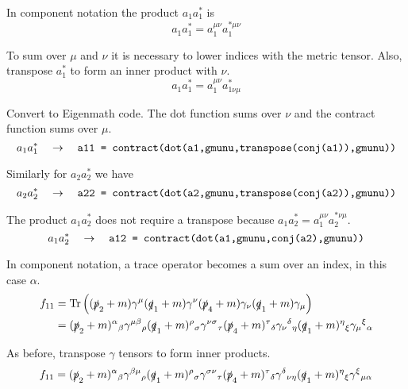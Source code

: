 In component notation the product $a_1a_1^*$ is
\begin{equation*}
a_1a_1^*=a_1^{\mu\nu}a_1^{*\mu\nu}
\end{equation*}

To sum over $\mu$ and $\nu$ it is necessary to lower indices with the metric tensor.
Also, transpose $a_1^*$ to form an inner product with $\nu$.
\begin{equation*}
a_1a_1^*=a_1^{\mu\nu}a_{1\nu\mu}^*
\end{equation*}

Convert to Eigenmath code.
The dot function sums over $\nu$ and the contract function sums over $\mu$.
\begin{equation*}
a_1a_1^*
\quad\rightarrow\quad
\text{\tt a11 = contract(dot(a1,gmunu,transpose(conj(a1)),gmunu))}
\end{equation*}

Similarly for $a_2a_2^*$ we have
\begin{equation*}
a_2a_2^*
\quad\rightarrow\quad
\text{\tt a22 = contract(dot(a2,gmunu,transpose(conj(a2)),gmunu))}
\end{equation*}

The product $a_1a_2^*$ does not require a transpose because $a_1a_2^*=a_1^{\mu\nu}a_2^{*\nu\mu}$.
\begin{equation*}
a_1a_2^*
\quad\rightarrow\quad
\text{\tt a12 = contract(dot(a1,gmunu,conj(a2),gmunu))}
\end{equation*}

In component notation, a trace operator becomes a sum over an index, in this case $\alpha$.
\begin{align*}
f_{11}
&=
\mathop{\rm Tr}
\left(
(\slashed{p}_2+m)\gamma^\mu(\slashed{q}_1+m)\gamma^\nu(\slashed{p}_4+m)\gamma_\nu(\slashed{q}_1+m)\gamma_\mu
\right)\\
&=
(\slashed{p}_2+m)^\alpha{}_\beta
\gamma^{\mu\beta}{}_\rho
(\slashed{q}_1+m)^\rho{}_\sigma
\gamma^{\nu\sigma}{}_\tau
(\slashed{p}_4+m)^\tau{}_\delta
\gamma_\nu{}^\delta{}_\eta
(\slashed{q}_1+m)^\eta{}_\xi
\gamma_\mu{}^\xi{}_\alpha
\end{align*}

As before, transpose $\gamma$ tensors to form inner products.
\begin{equation*}
f_{11}=
(\slashed{p}_2+m)^\alpha{}_\beta
\gamma^{\beta\mu}{}_\rho
(\slashed{q}_1+m)^\rho{}_\sigma
\gamma^{\sigma\nu}{}_\tau
(\slashed{p}_4+m)^\tau{}_\delta
\gamma^\delta{}_{\nu\eta}
(\slashed{q}_1+m)^\eta{}_\xi
\gamma^\xi{}_{\mu\alpha}
\end{equation*}

